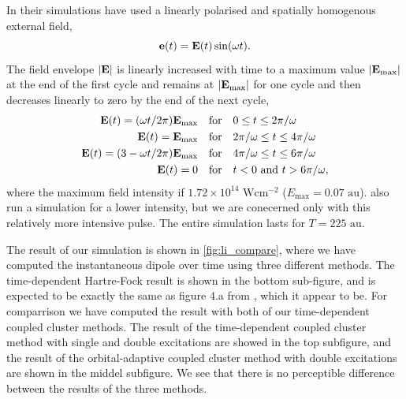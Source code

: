 In their simulations \citeauthor{li2005time} have used a linearly polarised and 
spatially homogenous external field, 
\begin{equation}
    \vb{e}(t) = \vb{E}(t)\sin(\omega t).
\end{equation}
The field envelope $|\vb{E}|$ is linearly increased with time to a maximum value 
$|\vb{E}_\text{max}|$ at the end of the first cycle and remains at $|\vb{E}_\text{max}|$
for one cycle and then decreases linearly to zero by the end of the next cycle,
\begin{equation}
    \begin{aligned}
        \vb{E}(t) = (\omega t / 2\pi) \vb{E}_\text{max} \quad &\text{for} \quad
            0 \leq t \leq 2\pi / \omega \\ 
        \vb{E}(t) = \vb{E}_\text{max} \quad &\text{for} \quad 
            2\pi / \omega \leq t \leq 4\pi / \omega \\ 
        \vb{E}(t) = (3 - \omega t / 2\pi) \vb{E}_\text{max} \quad &\text{for} \quad 
            4\pi / \omega \leq t \leq 6\pi / \omega \\
        \vb{E}(t) = 0 \quad &\text{for} \quad
            t < 0 \text{ and } t > 6\pi / \omega,
    \end{aligned}
\end{equation}
where the maximum field intensity if $1.72\times10^14 \text{ W} \text{cm}^{-2}$ 
($E_\text{max} = 0.07 \text{ au}$). \citeauthor{li2005time} also run a simulation 
for a lower intensity, but we are conecerned only with this relatively more intensive 
pulse. The entire simulation lasts for $T=225 \text{ au}$.

The result of our simulation is shown in \autoref{fig:li_compare}, where we have 
computed the instantaneous dipole over time using three different methods. The 
time-dependent Hartre-Fock result is shown in the bottom sub-figure, and is expected 
to be exactly the same as figure 4.a from \citeauthor{li2005time}\cite{li2005time},
which it appear to be. For comparrison we have computed the result with both of 
our time-dependent coupled cluster methods. The result of the time-dependent 
coupled cluster method with single and double excitations are showed in the top subfigure,
and the result of the orbital-adaptive coupled cluster method with double excitations 
are shown in the middel subfigure. We see that there is no perceptible difference between 
the results of the three methods.


